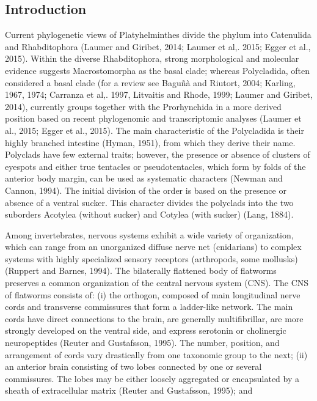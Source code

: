 \begin{multicols}{2}
\section*{Introduction}
\par{}Current phylogenetic views of Platyhelminthes divide the phylum into Catenulida and Rhabditophora (Laumer and Giribet, 2014; Laumer et al,. 2015; Egger et al.,
2015). Within the diverse Rhabditophora, strong morphological and molecular evidence suggests Macrostomorpha
as the basal clade; whereas Polycladida, often considered a
basal clade (for a review see Baguñà and Riutort, 2004;
Karling, 1967, 1974; Carranza et al,. 1997, Litvaitis and
Rhode, 1999; Laumer and Giribet, 2014), currently groups
together with the Prorhynchida in a more derived position
based on recent phylogenomic and transcriptomic analyses (Laumer et al., 2015; Egger et al., 2015). The main characteristic of the Polycladida is their highly branched intestine
(Hyman, 1951), from which they derive their name. Polyclads have few external traits; however, the presence or absence of clusters of eyespots and either true tentacles or
pseudotentacles, which form by folds of the anterior body
margin, can be used as systematic characters (Newman and
Cannon, 1994). The initial division of the order is based on
the presence or absence of a ventral sucker. This character
divides the polyclads into the two suborders Acotylea
(without sucker) and Cotylea (with sucker) (Lang, 1884).
\par{}Among invertebrates, nervous systems exhibit a wide
variety of organization, which can range from an unorganized diffuse nerve net (cnidarians) to complex systems
with highly specialized sensory receptors (arthropods,
some mollusks) (Ruppert and Barnes, 1994). The bilaterally flattened body of flatworms preserves a common organization of the central nervous system (CNS). The CNS of
flatworms consists of: (i) the orthogon, composed of main
longitudinal nerve cords and transverse commissures that
form a ladder-like network. The main cords have direct
connections to the brain, are generally multifibrillar, are
more strongly developed on the ventral side, and express
serotonin or cholinergic neuropeptides (Reuter and Gustafsson, 1995). The number, position, and arrangement of
cords vary drastically from one taxonomic group to the
next; (ii) an anterior brain consisting of two lobes connected by one or several commissures. The lobes may be either loosely aggregated or encapsulated by a sheath of
extracellular matrix (Reuter and Gustafsson, 1995); and

\end{multicols}
